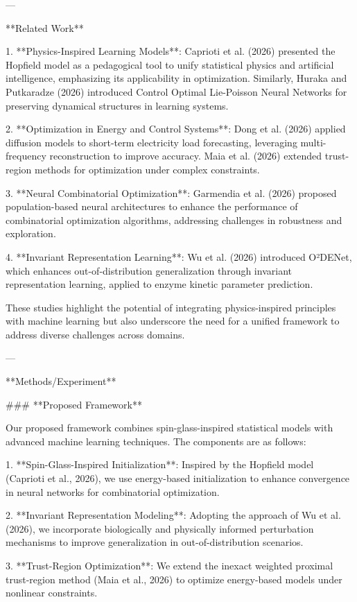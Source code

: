 ---

**Related Work**

1. **Physics-Inspired Learning Models**: Caprioti et al. (2026) presented the Hopfield model as a pedagogical tool to unify statistical physics and artificial intelligence, emphasizing its applicability in optimization. Similarly, Huraka and Putkaradze (2026) introduced Control Optimal Lie-Poisson Neural Networks for preserving dynamical structures in learning systems.

2. **Optimization in Energy and Control Systems**: Dong et al. (2026) applied diffusion models to short-term electricity load forecasting, leveraging multi-frequency reconstruction to improve accuracy. Maia et al. (2026) extended trust-region methods for optimization under complex constraints.

3. **Neural Combinatorial Optimization**: Garmendia et al. (2026) proposed population-based neural architectures to enhance the performance of combinatorial optimization algorithms, addressing challenges in robustness and exploration.

4. **Invariant Representation Learning**: Wu et al. (2026) introduced O²DENet, which enhances out-of-distribution generalization through invariant representation learning, applied to enzyme kinetic parameter prediction.

These studies highlight the potential of integrating physics-inspired principles with machine learning but also underscore the need for a unified framework to address diverse challenges across domains.

---

**Methods/Experiment**

### **Proposed Framework**

Our proposed framework combines spin-glass-inspired statistical models with advanced machine learning techniques. The components are as follows:

1. **Spin-Glass-Inspired Initialization**: Inspired by the Hopfield model (Caprioti et al., 2026), we use energy-based initialization to enhance convergence in neural networks for combinatorial optimization.

2. **Invariant Representation Modeling**: Adopting the approach of Wu et al. (2026), we incorporate biologically and physically informed perturbation mechanisms to improve generalization in out-of-distribution scenarios.

3. **Trust-Region Optimization**: We extend the inexact weighted proximal trust-region method (Maia et al., 2026) to optimize energy-based models under nonlinear constraints.


